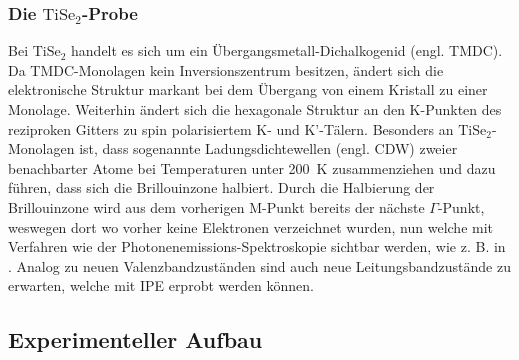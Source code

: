 \subsubsection{Die $\text{TiSe}_2$-Probe}

Bei $\text{TiSe}_2$ handelt es sich um ein Übergangsmetall-Dichalkogenid (engl. TMDC).
Da TMDC-Monolagen kein Inversionszentrum besitzen, ändert sich die elektronische Struktur markant bei dem Übergang von einem Kristall zu einer Monolage.
Weiterhin ändert sich die hexagonale Struktur an den K-Punkten des reziproken Gitters zu spin polarisiertem K- und K'-Tälern.
Besonders an $\text{TiSe}_2$-Monolagen ist, dass sogenannte Ladungsdichtewellen (engl. CDW) zweier benachbarter Atome bei Temperaturen unter \SI{200}{\kelvin} zusammenziehen und dazu führen, dass sich die Brillouinzone halbiert.
Durch die Halbierung der Brillouinzone wird aus dem vorherigen M-Punkt bereits der nächste $\Gamma$-Punkt, weswegen dort wo vorher keine Elektronen verzeichnet wurden, nun welche mit Verfahren wie der Photonenemissions-Spektroskopie sichtbar werden, wie z. B. in \cite{tise_pe}.
Analog zu neuen Valenzbandzuständen sind auch neue Leitungsbandzustände zu erwarten, welche mit IPE erprobt werden können. %


\subsection{Experimenteller Aufbau}

